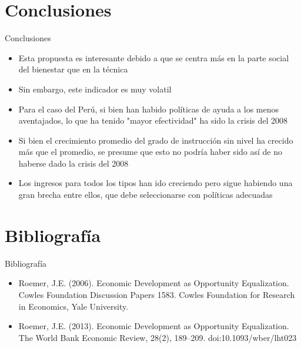 \documentclass[11.5 pt]{beamer}
\begin{document}
\section{Conclusiones}
\begin{frame}{Conclusiones}
	\begin{itemize}
		\item Esta propuesta es interesante debido a que se centra más en la parte social del bienestar que en la técnica
		\item Sin embargo, este indicador es muy volatil
		\item Para el caso del Perú, si bien han habido políticas de ayuda a los menos aventajados, lo que ha tenido "mayor efectividad" ha sido la crisis del 2008
		\item Si bien el crecimiento promedio del grado de instrucción sin nivel ha crecido más que el promedio, se presume que esto no podría haber sido así de no haberse dado la crisis del 2008
		\item Los ingresos para todos los tipos han ido creciendo pero sigue habiendo una gran brecha entre ellos, que debe seleccionarse con políticas adecuadas
	\end{itemize}
\end{frame}


\section{Bibliografía}
\begin{frame}{Bibliografía}
	\begin{itemize}
		\item Roemer, J.E. (2006). Economic Development as Opportunity Equalization. Cowles Foundation Discussion Papers 1583. Cowles Foundation for Research in Economics, Yale University. 
		\item Roemer, J.E. (2013). Economic Development as Opportunity Equalization. The World Bank Economic Review, 28(2), 189–209. doi:10.1093/wber/lht023 
	\end{itemize}
\end{frame}
\end{document}
